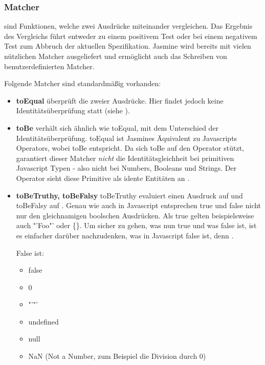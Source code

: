 \subsubsection{Matcher}
 sind Funktionen, welche zwei Ausdrücke miteinander vergleichen. Das Ergebnis des Vergleichs führt entweder zu einem positivem Test oder bei einem negativem Test zum Abbruch der aktuellen Spezifikation. Jasmine wird bereits mit vielen nützlichen Matcher ausgeliefert und ermöglicht auch das Schreiben von benutzerdefinierten Matcher.

Folgende Matcher sind standardmäßig vorhanden:

\begin{itemize}
  \item \textbf{toEqual} überprüft die  zweier Ausdrücke. Hier findet jedoch keine Identitätsüberprüfung statt (siehe ).

  \item \textbf{toBe} verhält sich ähnlich wie toEqual, mit dem Unterschied der Identitätsüberprüfung. toEqual ist Jasmines Äquivalent zu Javascripts \glqq{==\grqq} Operators, wobei toBe \glqq{===\grqq} entspricht. Da sich toBe auf den \glqq{===\grqq} Operator stützt, garantiert dieser Matcher \textit{nicht} die Identitätsgleichheit bei primitiven Javascript Typen - also nicht bei Numbers, Booleans und Strings. Der \glqq{===\grqq} Operator sieht diese Primitive als idente Entitäten an \autocite[16]{Hahn:2013}.

  \item \textbf{toBeTruthy, toBeFalsy}\newline
  toBeTruthy evaluiert einen Ausdruck auf  und toBeFalsy auf . Genau wie auch in Javascript entsprechen true und false nicht nur den gleichnamigen boolschen Ausdrücken. Als true gelten beispielsweise auch "'Foo"' oder \{\}. Um sicher zu gehen, was nun true und was false ist, ist es einfacher darüber nachzudenken, was in Javascript false ist, denn  \autocite[17]{Hahn:2013}.

  \newpage
  False ist:
    \begin{itemize}
      \item false
      \item 0
      \item "'"'
      \item undefined
      \item null
      \item NaN (Not a Number, zum Beispiel die Division durch 0)
    \end{itemize}


\end{itemize}
